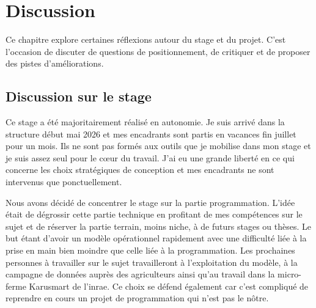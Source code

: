 \chapter{Discussion}
\label{ch:discussion}
%



Ce chapitre explore certaines réflexions autour du stage et du projet. C'est l'occasion de
discuter de questions de positionnement, de critiquer et de proposer des pistes d'améliorations.

\section{Discussion sur le stage}
\label{sec:disc-stage}

Ce stage a été majoritairement réalisé en autonomie. Je suis arrivé dans la structure début
mai 2026 et mes encadrants sont partis en vacances fin juillet pour un mois. Ils ne sont pas
formés aux outils que je mobilise dans mon stage et je suis assez seul pour le c\oe ur du
travail. J'ai eu une grande liberté en ce qui concerne les choix stratégiques de conception et
mes encadrants ne sont intervenus que ponctuellement.

Nous avons décidé de concentrer le stage sur la partie programmation. L'idée était de dégrossir
cette partie technique en profitant de mes compétences sur le sujet et de réserver la partie
terrain, moins niche, à de futurs stages ou thèses. Le but étant d'avoir un modèle opérationnel
rapidement avec une difficulté liée à la prise en main bien moindre que celle liée à la
programmation. Les prochaines personnes à travailler sur le sujet travailleront à l'exploitation
du modèle, à la campagne de données auprès des agriculteurs ainsi qu'au travail dans la
micro-ferme Karusmart de l'\gls{inrae}. Ce choix se défend également car c'est compliqué de
reprendre en cours un projet de programmation qui n'est pas le nôtre.


